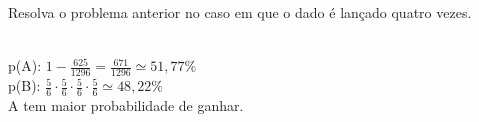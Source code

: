 \begin{ex}
Resolva o problema anterior no caso em que o dado é lançado quatro vezes.
  \begin{sol}
   \phantom{A} \\
   p(A): $1-\frac{625}{1296}=\frac{671}{1296}\simeq51,77\%$ \\
   p(B): $\frac{5}{6}\cdot\frac{5}{6}\cdot\frac{5}{6}\cdot\frac{5}{6}\simeq48,22\%$ \\
   A tem maior probabilidade de ganhar.
  \end{sol}
\end{ex}